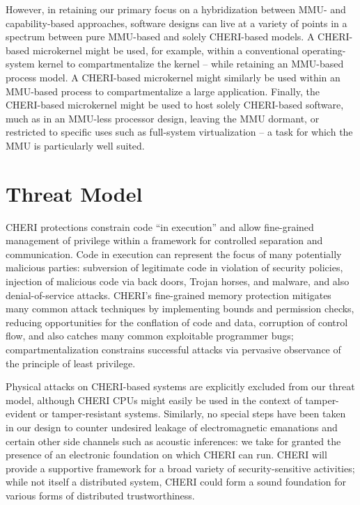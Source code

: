 However, in retaining our primary focus on a hybridization between MMU- and
capability-based approaches, software designs can live at a variety of points
in a spectrum between pure MMU-based and solely CHERI-based models.
A CHERI-based microkernel might be used, for example, within a conventional
operating-system kernel to compartmentalize the kernel -- while retaining an
MMU-based process model.
A CHERI-based microkernel might similarly be used within an MMU-based process
to compartmentalize a large application.
Finally, the CHERI-based microkernel might be used to host solely CHERI-based
software, much as in an MMU-less processor design, leaving the MMU dormant,
or restricted to specific uses such as full-system virtualization -- a task
for which the MMU is particularly well suited.

\section{Threat Model}

%

CHERI protections constrain code ``in execution'' and allow fine-grained management
of privilege within a framework for controlled separation and communication.
Code in execution can represent the focus of many potentially malicious parties:
subversion of legitimate code in violation of security policies, injection of malicious
code via back doors, Trojan horses, and malware, and also 
denial-of-service attacks.
CHERI's fine-grained memory protection mitigates 
many common attack techniques by implementing bounds and permission checks,
reducing opportunities for the conflation of code and data, corruption of
control flow, and also catches many common exploitable programmer bugs;
compartmentalization constrains successful attacks via pervasive observance of
the principle of least privilege.

Physical attacks on CHERI-based systems are explicitly excluded from our threat model,
although CHERI CPUs might easily be used in the context of tamper-evident or
tamper-resistant systems.
Similarly, no special steps have been taken in our design to counter undesired
leakage of electromagnetic emanations and certain other side channels such as acoustic inferences: 
we take for granted the presence of an
electronic foundation on which CHERI can run.
CHERI will provide a supportive framework for a broad variety of security-sensitive
activities; while not itself a distributed system, CHERI could form a sound foundation for various forms of distributed trustworthiness.

